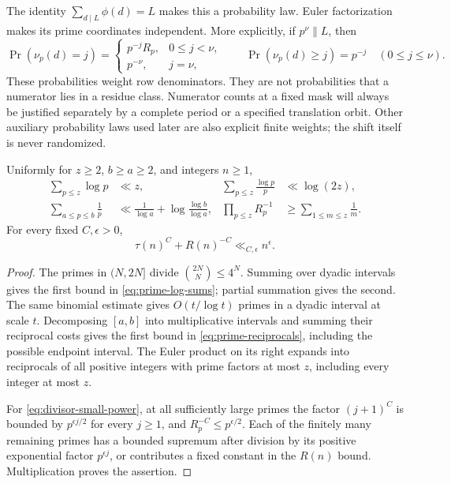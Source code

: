 The identity $\sum_{d\mid L}\phi(d)=L$ makes this a probability law.
Euler factorization makes its prime coordinates independent. More
explicitly, if $p^\nu\parallel L$, then
\[
 \Pr(\nu_p(d)=j)=
 \begin{cases}p^{-j}R_p,&0\le j<\nu,\\p^{-\nu},&j=\nu,
 \end{cases}
 \qquad
 \Pr(\nu_p(d)\ge j)=p^{-j}\quad(0\le j\le\nu).
\]
These probabilities weight row denominators. They are not probabilities
that a numerator lies in a residue class. Numerator counts at a fixed mask
will always be justified separately by a complete period or a specified
translation orbit. Other auxiliary probability laws used later are also
explicit finite weights; the shift itself is never randomized.

\begin{lemma}\label{pre:elementary-prime-bounds}
Uniformly for $z\ge2$, $b\ge a\ge2$, and integers $n\ge1$,
\begin{align}
 \sum_{p\le z}\log p&\ll z,
 &\sum_{p\le z}\frac{\log p}{p}&\ll\log(2z),\label{eq:prime-log-sums}\\
 \sum_{a\le p\le b}\frac1p
 &\ll \frac1{\log a}+\log\frac{\log b}{\log a},
 &\prod_{p\le z}R_p^{-1}&\ge\sum_{1\le m\le z}\frac1m.
 \label{eq:prime-reciprocals}
\end{align}
For every fixed $C,\epsilon>0$,
\begin{equation}\label{eq:divisor-small-power}
 \tau(n)^C+R(n)^{-C}\ll_{C,\epsilon}n^\epsilon.
\end{equation}
\end{lemma}
\begin{proof}
The primes in $(N,2N]$ divide $\binom{2N}{N}\le4^N$.
Summing over dyadic intervals gives the first bound in
\eqref{eq:prime-log-sums}; partial summation gives the second. The same
binomial estimate gives $O(t/\log t)$ primes in a dyadic interval at
scale $t$. Decomposing $[a,b]$ into multiplicative intervals and summing
their reciprocal costs gives the first bound in
\eqref{eq:prime-reciprocals}, including the possible endpoint interval.
The Euler product on its right expands into reciprocals of all positive
integers with prime factors at most $z$, including every integer at most
$z$.

For \eqref{eq:divisor-small-power}, at all sufficiently large primes the
factor $(j+1)^C$ is bounded by $p^{\epsilon j/2}$ for every $j\ge1$,
and $R_p^{-C}\le p^{\epsilon/2}$. Each of the finitely many remaining
primes has a bounded supremum after division by its positive exponential
factor $p^{\epsilon j}$, or contributes a fixed constant in the
$R(n)$ bound. Multiplication proves the assertion.
\end{proof}

